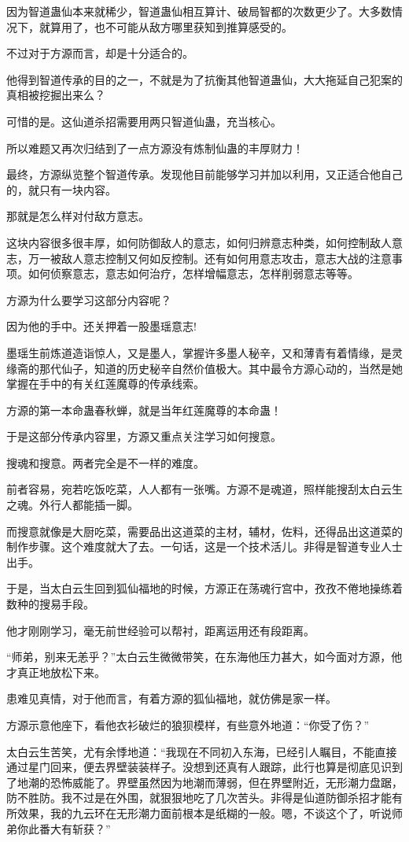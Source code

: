 \begin{this_body}
因为智道蛊仙本来就稀少，智道蛊仙相互算计、破局智都的次数更少了。大多数情况下，就算用了，也不可能从敌方哪里获知到推算感受的。

不过对于方源而言，却是十分适合的。

他得到智道传承的目的之一，不就是为了抗衡其他智道蛊仙，大大拖延自己犯案的真相被挖掘出来么？

可惜的是。这仙道杀招需要用两只智道仙蛊，充当核心。

所以难题又再次归结到了一点方源没有炼制仙蛊的丰厚财力！

最终，方源纵览整个智道传承。发现他目前能够学习并加以利用，又正适合他自己的，就只有一块内容。

那就是怎么样对付敌方意志。

这块内容很多很丰厚，如何防御敌人的意志，如何归辨意志种类，如何控制敌人意志，万一被敌人意志控制又何如反控制。还有如何用意志攻击，意志大战的注意事项。如何侦察意志，意志如何治疗，怎样增幅意志，怎样削弱意志等等。

方源为什么要学习这部分内容呢？

因为他的手中。还关押着一股墨瑶意志!

墨瑶生前炼道造诣惊人，又是墨人，掌握许多墨人秘辛，又和薄青有着情缘，是灵缘斋的那代仙子，知道的历史秘辛自然价值极大。其中最令方源心动的，当然是她掌握在手中的有关红莲魔尊的传承线索。

方源的第一本命蛊春秋蝉，就是当年红莲魔尊的本命蛊！

于是这部分传承内容里，方源又重点关注学习如何搜意。

搜魂和搜意。两者完全是不一样的难度。

前者容易，宛若吃饭吃菜，人人都有一张嘴。方源不是魂道，照样能搜刮太白云生之魂。外行人都能插一脚。

而搜意就像是大厨吃菜，需要品出这道菜的主材，辅材，佐料，还得品出这道菜的制作步骤。这个难度就大了去。一句话，这是一个技术活儿。非得是智道专业人士出手。

于是，当太白云生回到狐仙福地的时候，方源正在荡魂行宫中，孜孜不倦地操练着数种的搜易手段。

他才刚刚学习，毫无前世经验可以帮衬，距离运用还有段距离。

“师弟，别来无恙乎？”太白云生微微带笑，在东海他压力甚大，如今面对方源，他才真正地放松下来。

患难见真情，对于他而言，有着方源的狐仙福地，就仿佛是家一样。

方源示意他座下，看他衣衫破烂的狼狈模样，有些意外地道：“你受了伤？”

太白云生苦笑，尤有余悸地道：“我现在不同初入东海，已经引人瞩目，不能直接通过星门回来，便去界壁装装样子。没想到还真有人跟踪，此行也算是彻底见识到了地潮的恐怖威能了。界壁虽然因为地潮而薄弱，但在界壁附近，无形潮力盘踞，防不胜防。我不过是在外围，就狠狠地吃了几次苦头。非得是仙道防御杀招才能有所效果，我的九云环在无形潮力面前根本是纸糊的一般。嗯，不谈这个了，听说师弟你此番大有斩获？”


\end{this_body}
